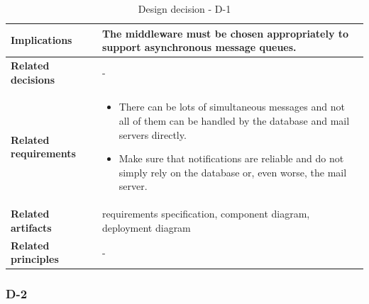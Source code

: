 \documentclass[11pt]{article}
\begin{document}
\begin{table}[h]
\begin{tabularx}{\textwidth}{ | l | X |}
	\hline
	\cellcolor[gray]{0.9}
	\textbf{Implications} & The middleware must be chosen appropriately to support asynchronous message queues. \\
	\hline
	\cellcolor[gray]{0.9}
	\textbf{Related decisions} & - \\
	\hline
	\cellcolor[gray]{0.9}
	\textbf{Related requirements} &
		\begin{itemize}
		\item There can be lots of simultaneous messages and not all of them can be handled by the database and mail servers directly.
		\item Make sure that notifications are reliable and do not simply rely on the database or, even worse, the mail server.
		\end{itemize}\\
	\hline
	\cellcolor[gray]{0.9}
	\textbf{Related artifacts} & requirements specification, component diagram, deployment diagram \\
	\hline
	\cellcolor[gray]{0.9}
	\textbf{Related principles} & -\\
	\hline
	\end{tabularx}
	\caption{Design decision - D-1}
	\label{dec:D1}
\end{table}

\newpage

\subsubsection{D-2}
\end{document}
